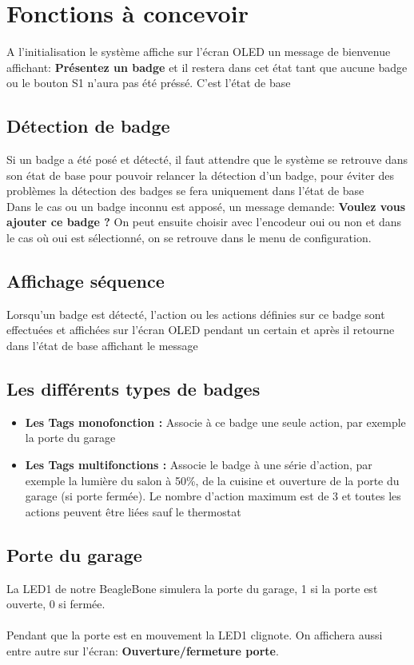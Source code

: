 \section{Fonctions à concevoir}
A l'initialisation le système affiche sur l'écran OLED un message de bienvenue affichant: \textbf{Présentez un badge} et il restera dans cet état tant que aucune badge ou le bouton S1 n'aura pas été préssé. C'est l'état de base

\subsection{Détection de badge}
Si un badge a été posé et détecté, il faut attendre que le système se retrouve dans son état de base pour pouvoir relancer la détection d'un badge, pour éviter des problèmes la détection des badges se fera uniquement dans l'état de base\\
Dans le cas ou un badge inconnu est apposé, un message demande: \textbf{Voulez vous ajouter ce badge ?} On peut ensuite choisir avec l'encodeur oui ou non et dans le cas où oui est sélectionné, on se retrouve dans le menu de configuration.

\subsection{Affichage séquence}
Lorsqu'un badge est détecté, l'action ou les actions définies sur ce badge sont effectuées et affichées sur l'écran OLED pendant un certain et après il retourne dans l'état de base affichant le message


\subsection{Les différents types de badges}
\begin{itemize}
    \item \textbf{Les Tags monofonction :} Associe à ce badge une seule action, par exemple la porte du garage
    \item \textbf{Les Tags multifonctions :} Associe le badge à une série d'action, par exemple la lumière du salon à 50\%, de la cuisine et ouverture de la porte du garage (si porte fermée). Le nombre d'action maximum est de 3 et toutes les actions peuvent être liées sauf le thermostat
\end{itemize}

\subsection{Porte du garage}
La LED1 de notre BeagleBone simulera la porte du garage, 1 si la porte est ouverte, 0 si fermée. \\\\
Pendant que la porte est en mouvement la LED1 clignote. On affichera aussi entre autre sur l'écran: \textbf{Ouverture/fermeture porte}.

